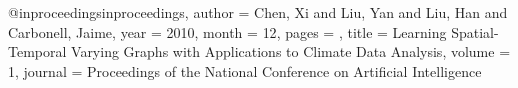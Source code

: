 @inproceedings{inproceedings,
author = {Chen, Xi and Liu, Yan and Liu, Han and Carbonell, Jaime},
year = {2010},
month = {12},
pages = {},
title = {Learning Spatial-Temporal Varying Graphs with Applications to Climate Data Analysis},
volume = {1},
journal = {Proceedings of the National Conference on Artificial Intelligence}
}
